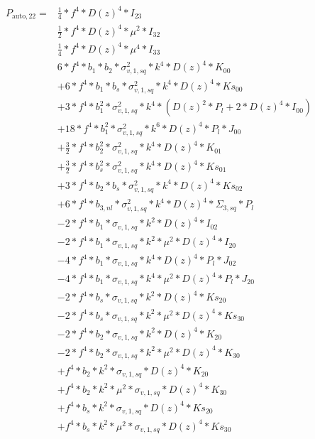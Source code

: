 \documentclass{article}
\begin{document}
\begin{equation}
\begin{aligned}  
P_{\mathrm{auto},22}=&\frac{1}{4}*f^{4}*D(z)^{4}*I_{23} \\
&\frac{1}{2}*f^{4}*D(z)^{4}*\mu^{2}*I_{32} \\
&\frac{1}{4}*f^{4}*D(z)^{4}*\mu^{4}*I_{33} \\
&6*f^{4}*b_{1}*b_{2}*\sigma_{v,1,sq}^{2}*k^{4}*D(z)^{4}*K_{00} \\
&+6*f^{4}*b_{1}*b_{s}*\sigma_{v,1,sq}^{2}*k^{4}*D(z)^{4}*Ks_{00} \\
&+3*f^{4}*b_{1}^{2}*\sigma_{v,1,sq}^{2}*k^{4}*(D(z)^{2}*P_l + 2*D(z)^{4}*I_{00}) \\
&+18*f^{4}*b_{1}^{2}*\sigma_{v,1,sq}^{2}*k^{6}*D(z)^{4}*P_l*J_{00} \\
&+\frac{3}{2}*f^{4}*b_{2}^{2}*\sigma_{v,1,sq}^{2}*k^{4}*D(z)^{4}*K_{01}\\
&+\frac{3}{2}*f^{4}*b_{s}^{2}*\sigma_{v,1,sq}^{2}*k^{4}*D(z)^{4}*Ks_{01}\\
&+3*f^{4}*b_{2}*b_{s}*\sigma_{v,1,sq}^{2}*k^{4}*D(z)^{4}*Ks_{02}\\
&+6*f^{4}*b_{3,nl}*\sigma_{v,1,sq}^{2}*k^{4}*D(z)^{4}*\Sigma_{3,sq}*P_l\\
&-2*f^{4}*b_{1}*\sigma_{v,1,sq}*k^{2}*D(z)^{4}*I_{02} \\
&-2*f^{4}*b_{1}*\sigma_{v,1,sq}*k^{2}*\mu^{2}*D(z)^{4}*I_{20} \\
&-4*f^{4}*b_{1}*\sigma_{v,1,sq}*k^{4}*D(z)^{4}*P_l*J_{02} \\
&-4*f^{4}*b_{1}*\sigma_{v,1,sq}*k^{4}*\mu^{2}*D(z)^{4}*P_l*J_{20} \\
&-2*f^{4}*b_{s}*\sigma_{v,1,sq}*k^{2}*D(z)^{4}*Ks_{20} \\
&-2*f^{4}*b_{s}*\sigma_{v,1,sq}*k^{2}*\mu^{2}*D(z)^{4}*Ks_{30} \\
&-2*f^{4}*b_{2}*\sigma_{v,1,sq}*k^{2}*D(z)^{4}*K_{20} \\
&-2*f^{4}*b_{2}*\sigma_{v,1,sq}*k^{2}*\mu^{2}*D(z)^{4}*K_{30} \\
&+f^{4}*b_{2}*k^{2}*\sigma_{v,1,sq}*D(z)^{4}*K_{20} \\
&+f^{4}*b_{2}*k^{2}*\mu^{2}*\sigma_{v,1,sq}*D(z)^{4}*K_{30} \\
&+f^{4}*b_{s}*k^{2}*\sigma_{v,1,sq}*D(z)^{4}*Ks_{20} \\
&+f^{4}*b_{s}*k^{2}*\mu^{2}*\sigma_{v,1,sq}*D(z)^{4}*Ks_{30} \\
\end{aligned}
\end{equation}
\end{document}
